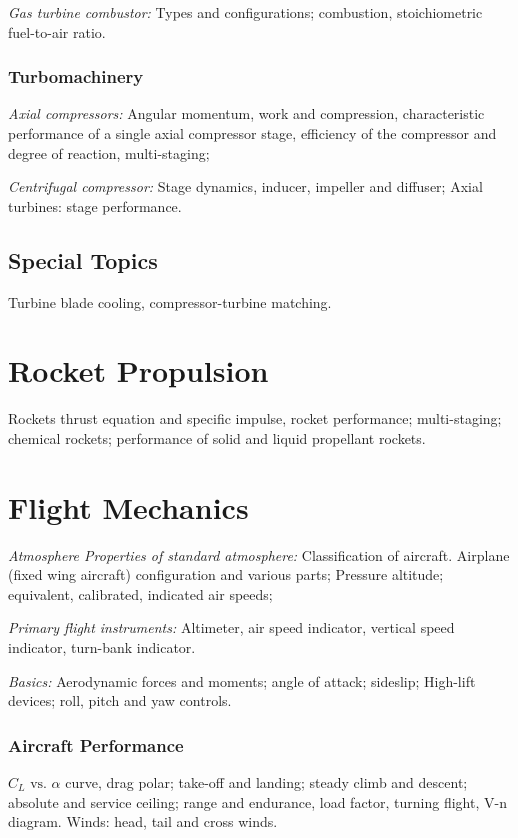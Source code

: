 \noindent\textit{Gas turbine combustor:} Types and configurations; combustion, stoichiometric fuel-to-air ratio.

\subsubsection{Turbomachinery}

\noindent\textit{Axial compressors:} Angular momentum, work and compression, characteristic performance of a single axial compressor stage, efficiency of the compressor and degree of reaction, multi-staging;

\noindent\textit{Centrifugal compressor:} Stage dynamics, inducer, impeller and diffuser; Axial turbines: stage performance.

\subsection{Special Topics}
Turbine blade cooling, compressor-turbine matching.

\section{Rocket Propulsion}
Rockets thrust equation and specific impulse, rocket performance; multi-staging; chemical rockets; performance of solid and liquid propellant rockets.

\section{Flight Mechanics}

\noindent\textit{Atmosphere Properties of standard atmosphere:} Classification of aircraft. Airplane (fixed wing aircraft) configuration and various parts; Pressure altitude;
equivalent, calibrated, indicated air speeds;

\noindent\textit{Primary flight instruments:} Altimeter, air speed indicator, vertical speed indicator, turn-bank indicator.

\noindent\textit{Basics:} Aerodynamic forces and moments; angle of attack; sideslip; High-lift devices; roll, pitch and yaw controls.

\subsubsection{Aircraft Performance}
$C_L \text{ vs. } \alpha$ curve, drag polar; take-off and landing; steady climb and descent; absolute and service ceiling; range and endurance, load factor, turning flight, V-n diagram. Winds: head, tail and cross winds.

